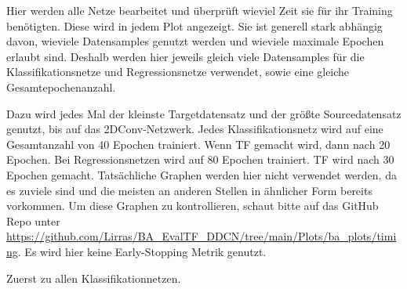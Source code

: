 Hier werden alle Netze bearbeitet und überprüft wieviel Zeit sie für ihr Training benötigten. 
Diese wird in jedem Plot angezeigt. Sie ist generell stark abhängig davon, wieviele Datensamples genutzt werden und 
wieviele maximale Epochen erlaubt sind. Deshalb werden hier jeweils gleich viele Datensamples für die Klassifikationsnetze und 
Regressionsnetze verwendet, sowie eine gleiche Gesamtepochenanzahl. 

Dazu wird jedes Mal der kleinste Targetdatensatz und der größte Sourcedatensatz genutzt, bis auf das 2DConv-Netzwerk. Jedes Klassifikationsnetz 
wird auf eine Gesamtanzahl von 40 Epochen trainiert. Wenn TF gemacht wird, dann nach 20 Epochen. Bei Regressionsnetzen wird auf 80 Epochen 
trainiert. TF wird nach 30 Epochen gemacht. Tatsächliche Graphen werden hier nicht verwendet werden, da es zuviele sind und die meisten an 
anderen Stellen in ähnlicher Form bereits vorkommen. Um diese Graphen zu kontrollieren, schaut bitte auf das GitHub Repo unter 
\url{https://github.com/Lirras/BA_EvalTF_DDCN/tree/main/Plots/ba_plots/timing}. 
Es wird hier keine Early-Stopping Metrik genutzt. 

Zuerst zu allen Klassifikationnetzen. 
